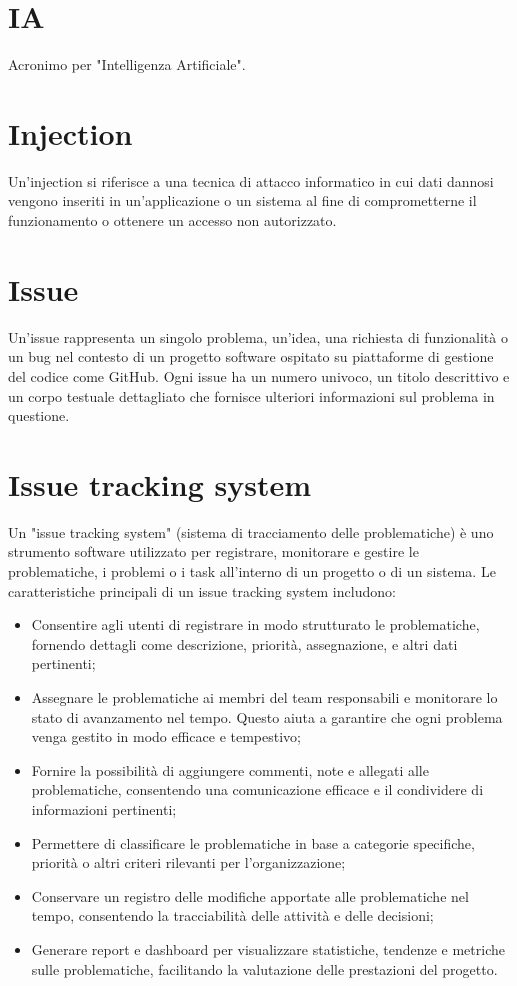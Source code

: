 \documentclass{article}
\begin{document}
\section{IA}
Acronimo per "Intelligenza Artificiale".

\section{Injection}
Un'injection si riferisce a una tecnica di attacco informatico in cui dati dannosi vengono inseriti in un'applicazione o un sistema al fine di comprometterne il funzionamento o ottenere un accesso non autorizzato.

\section{Issue}
Un'issue rappresenta un singolo problema, un'idea, una richiesta di funzionalità o un bug nel contesto di un progetto software ospitato su piattaforme di gestione del codice come GitHub. Ogni issue ha un numero univoco, un titolo descrittivo e un corpo testuale dettagliato che fornisce ulteriori informazioni sul problema in questione.

\section{Issue tracking system}
Un "issue tracking system" (sistema di tracciamento delle problematiche) è uno strumento software utilizzato per registrare, monitorare e gestire le problematiche, i problemi o i task all'interno di un progetto o di un sistema. Le caratteristiche principali di un issue tracking system includono:
\begin{itemize}
    \item Consentire agli utenti di registrare in modo strutturato le problematiche, fornendo dettagli come descrizione, priorità, assegnazione, e altri dati pertinenti;
    \item Assegnare le problematiche ai membri del team responsabili e monitorare lo stato di avanzamento nel tempo. Questo aiuta a garantire che ogni problema venga gestito in modo efficace e tempestivo;
    \item Fornire la possibilità di aggiungere commenti, note e allegati alle problematiche, consentendo una comunicazione efficace e il condividere di informazioni pertinenti;
    \item Permettere di classificare le problematiche in base a categorie specifiche, priorità o altri criteri rilevanti per l'organizzazione;
    \item Conservare un registro delle modifiche apportate alle problematiche nel tempo, consentendo la tracciabilità delle attività e delle decisioni;
    \item Generare report e dashboard per visualizzare statistiche, tendenze e metriche sulle problematiche, facilitando la valutazione delle prestazioni del progetto.
\end{itemize}
\end{document}
